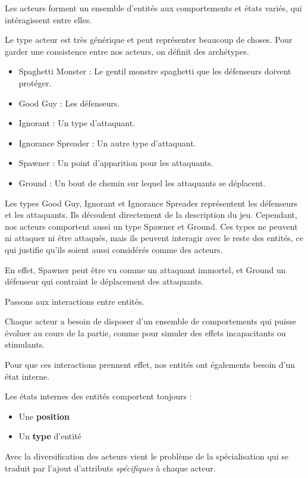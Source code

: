 \documentclass{article}
\begin{document}
Les acteurs forment un ensemble d'entités aux comportements et états variés, 
qui intéragissent entre elles.

Le type acteur est très générique et peut représenter beaucoup de choses.
Pour garder une consistence entre nos acteurs, on définit des archétypes.

\begin{itemize}
   \item Spaghetti Monster : Le gentil monstre spaghetti que les défenseurs doivent protéger.
   \item Good Guy : Les défenseurs.
   \item Ignorant : Un type d'attaquant.
   \item Ignorance Spreader : Un autre type d'attaquant.
   \item Spawner : Un point d'apparition pour les attaquants.
   \item Ground : Un bout de chemin sur lequel les attaquants se déplacent.
\end{itemize}

Les types Good Guy, Ignorant et Ignorance Spreader représentent 
les défenseurs et les attaquants. Ils découlent directement de la description du jeu.
Cependant, nos acteurs comportent aussi un type Spawner et Ground.
Ces types ne peuvent ni attaquer ni être attaqués, mais ils peuvent interagir avec le reste des entités, ce qui justifie qu'ils
soient aussi considérés comme des acteurs.

En effet, Spawner peut être vu comme un attaquant immortel, et Ground 
un défenseur qui contraint le déplacement des attaquants.

Passons aux interactions entre entités.

Chaque acteur a besoin de disposer d'un ensemble de comportements qui puisse évoluer 
au cours de la partie, comme pour simuler des effets incapacitants 
ou stimulants.

Pour que ces interactions prennent effet, nos entités ont 
égalements besoin d'un état interne.

Les états internes des entités comportent toujours :

\begin{itemize}
    \item Une \textbf{position}
    \item Un \textbf{type} d'entité
\end{itemize}

Avec la diversification des acteurs vient le problème de la spécialisation qui se traduit par l'ajout d'attributs \emph{spécifiques} à chaque acteur.
\end{document}
